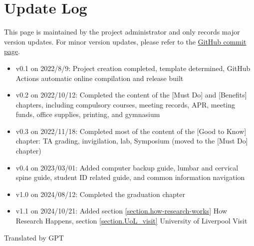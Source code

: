 \chapter{Update Log}

This page is maintained by the project administrator and only records major version updates. For minor version updates, please refer to the \href{https://github.com/xp-pgrs-unofficial-guide/xp_pgrs_unofficial_guide/commits/main}{GitHub commit page}.

\begin{itemize}
    \item v0.1 on 2022/8/9: Project creation completed, template determined, GitHub Actions automatic online compilation and release built
    \item v0.2 on 2022/10/12: Completed the content of the [Must Do] and [Benefits] chapters, including compulsory courses, meeting records, APR, meeting funds, office supplies, printing, and gymnasium
    \item v0.3 on 2022/11/18: Completed most of the content of the [Good to Know] chapter: TA grading, invigilation, lab, Symposium (moved to the [Must Do] chapter)
    \item v0.4 on 2023/03/01: Added computer backup guide, lumbar and cervical spine guide, student ID related guide, and common information navigation
    \item v1.0 on 2024/08/12: Completed the graduation chapter
    \item v1.1 on 2024/10/21: Added section \ref{section.how-research-works} How Research Happens, section \ref{section.UoL_visit} University of Liverpool Visit
\end{itemize}

\begin{flushright}
    Translated by GPT
\end{flushright}